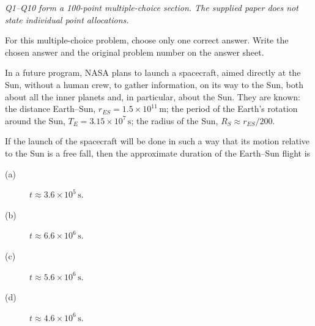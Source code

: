 \textit{Q1--Q10 form a 100-point multiple-choice section. The supplied paper
does not state individual point allocations.}

For this multiple-choice problem, choose only one correct answer. Write the
chosen answer and the original problem number on the answer sheet.

In a future program, NASA plans to launch a spacecraft, aimed directly at
the Sun, without a human crew, to gather information, on its way to the Sun,
both about all the inner planets and, in particular, about the Sun.
They are known: the distance Earth--Sun, $r_{ES}=1.5\times10^{11}\,\mathrm{m}$;
the period of the Earth's rotation around the Sun, $T_E=3.15\times10^7\,\mathrm{s}$;
the radius of the Sun, $R_S\approx r_{ES}/200$.

If the launch of the spacecraft will be done in such a way that its motion
relative to the Sun is a free fall, then the approximate duration of the
Earth--Sun flight is
\begin{description}
\item[(a)] $t\approx3.6\times10^5\,\mathrm{s}$.
\item[(b)] $t\approx6.6\times10^6\,\mathrm{s}$.
\item[(c)] $t\approx5.6\times10^6\,\mathrm{s}$.
\item[(d)] $t\approx4.6\times10^6\,\mathrm{s}$.
\end{description}
